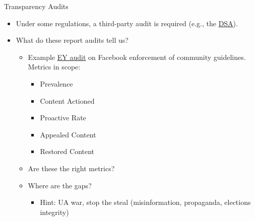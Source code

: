 \documentclass[nobackground,dvipsnames,table]{beamer}
\begin{document}
\begin{frame}{Transparency Audits}

\begin{itemize}
    \item Under some regulations, a third-party audit is required (e.g., the \href{https://digitalservicesact.cc/dsa/art28.html}{DSA}).
    \item What do these report audits tell us?

    \begin{itemize}
        \item Example \href{https://about.fb.com/wp-content/uploads/2022/05/EY-CSER-Independent-Assessment-Q4-2021.pdf}{EY audit} on Facebook enforcement of community guidelines. Metrics in scope:

        \begin{itemize}
            \item Prevalence 
            \item Content Actioned 
            \item Proactive Rate 
            \item Appealed Content 
            \item Restored Content 
        \end{itemize}

        \item Are these the right metrics? 
        \item Where are the gaps?

        \begin{itemize}
            \item Hint: UA war, stop the steal (misinformation, propaganda, elections integrity)
        \end{itemize}
    \end{itemize}
\end{itemize}
\end{frame}

\end{document}
